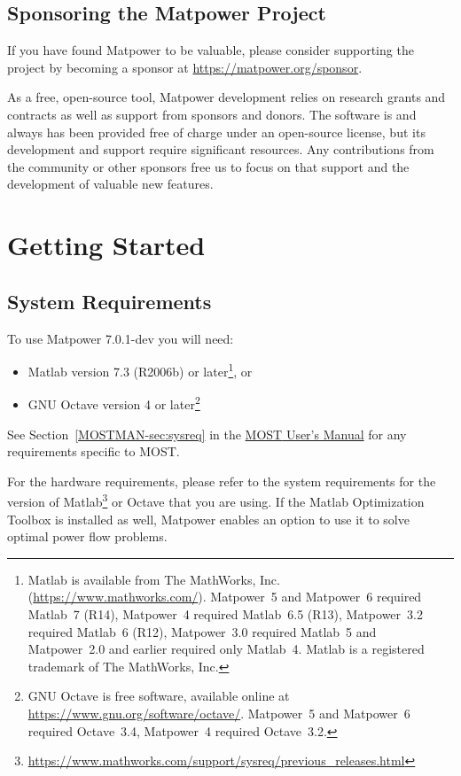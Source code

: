 \documentclass[12pt]{article}
\newcommand{\mpver}[0]{7.0.1-dev}
\newcommand{\matlab}[0]{{\sc Matlab}}
\newcommand{\matpower}[0]{{\sc Matpower}}
\newcommand{\most}[0]{{MOST}}
\newcommand{\mostver}[0]{1.0.2}
\newcommand{\ot}[0]{{Optimization Toolbox}}
\newcommand{\mostmanurl}[0]{https://matpower.org/docs/MOST-manual-\mostver.pdf}
\newcommand{\mostman}[0]{\href{\mostmanurl}{\most{} User's Manual}}
\numberwithin{equation}{section}
\numberwithin{table}{section}
\numberwithin{figure}{section}
\begin{document}
\subsection{Sponsoring the \matpower{} Project}
\label{sec:sponsor}

If you have found \matpower{} to be valuable, please consider supporting the project by becoming a sponsor at \url{https://matpower.org/sponsor}.

As a free, open-source tool, \matpower{} development relies on research grants and contracts as well as support from sponsors and donors. The software is and always has been provided free of charge under an open-source license, but its development and support require significant resources. Any contributions from the community or other sponsors free us to focus on that support and the development of valuable new features.

\clearpage
\section{Getting Started}

\subsection{System Requirements}
\label{sec:sysreq}
To use \matpower{} \mpver{} you will need:
\begin{itemize}
\item \matlab{}\textsuperscript{\tiny \textregistered} version 7.3 (R2006b) or later\footnote{\matlab{} is available from The MathWorks, Inc. (\url{https://www.mathworks.com/}). \matpower{}~5 and \matpower{}~6 required \matlab{}~7 (R14), \matpower{}~4 required \matlab{}~6.5 (R13), \matpower{}~3.2 required \matlab{}~6 (R12), \matpower{}~3.0 required \matlab{}~5 and \matpower{}~2.0 and earlier required only \matlab{}~4. \matlab{} is a registered trademark of The MathWorks, Inc.}, or
\item GNU Octave version 4 or later\footnote{GNU Octave \cite{octave} is free software, available online at \url{https://www.gnu.org/software/octave/}. \matpower{}~5 and \matpower{}~6 required Octave~3.4, \matpower{}~4 required Octave~3.2.}
\end{itemize}

See Section~\ref{MOSTMAN-sec:sysreq} in the \mostman{} for any requirements specific to \most{}.

For the hardware requirements, please refer to the system requirements for the version of \matlab{}\footnote{\url{https://www.mathworks.com/support/sysreq/previous_releases.html}} or Octave that you are using. If the \matlab{} \ot{} is installed as well, \matpower{} enables an option to use it to solve optimal power flow problems.
\end{document}
